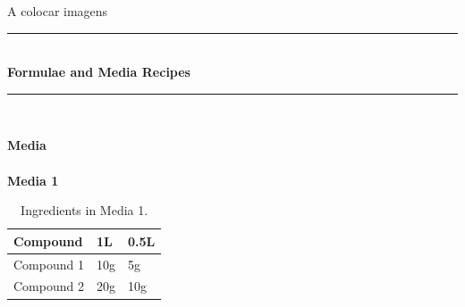 \documentclass[idxtotoc,hyperref,openany]{labbook} %
\newcommand{\HRule}{\rule{\linewidth}{0.5mm}} %
\begin{document}


A colocar imagens

\labday{} %

\begin{center}
\HRule \\[0.4cm]
{\huge \textbf{Formulae and Media Recipes}}\\[0.4cm] %
\HRule \\[1.5cm]
\end{center}


\newpage

\huge \textbf{Media} \\ \\

\normalsize \textbf{Media 1}\\
\begin{table}[H]
\begin{tabular}{l l l}
\toprule
\textbf{Compound} & \textbf{1L} & \textbf{0.5L}\\
\toprule
Compound 1 & 10g & 5g\\
Compound 2 & 20g & 10g\\
\bottomrule
\end{tabular}
\caption{Ingredients in Media 1.}
\label{tab:med1}
\end{table}





\newpage
\end{document}
